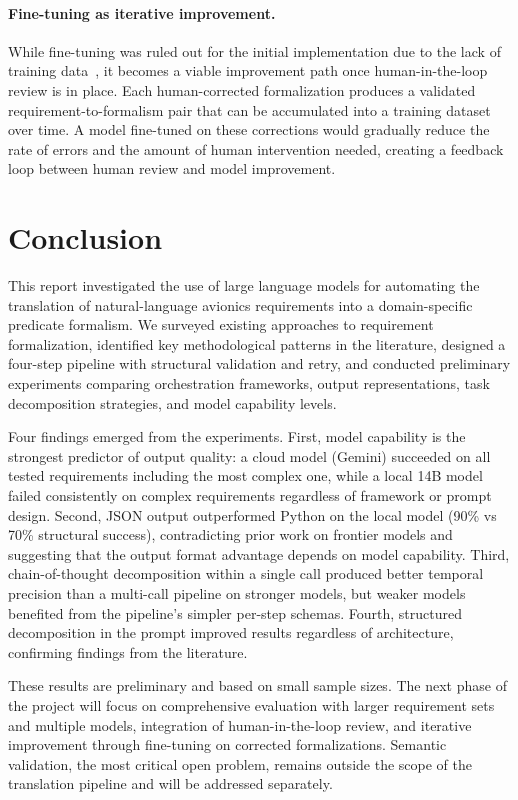\paragraph{Fine-tuning as iterative improvement.}
While fine-tuning was ruled out for the initial implementation due to the
lack of training data~\cite{hahn2022formal}, it becomes a viable
improvement path once human-in-the-loop review is in place. Each
human-corrected formalization produces a validated
requirement-to-formalism pair that can be accumulated into a training
dataset over time. A model fine-tuned on these corrections would
gradually reduce the rate of errors and the amount of human intervention
needed, creating a feedback loop between human review and model
improvement.


\section{Conclusion}
\label{sec:conclusion}

This report investigated the use of large language models for
automating the translation of natural-language avionics requirements
into a domain-specific predicate formalism. We surveyed existing
approaches to requirement formalization, identified key methodological
patterns in the literature, designed a four-step pipeline with
structural validation and retry, and conducted preliminary experiments
comparing orchestration frameworks, output representations, task
decomposition strategies, and model capability levels.

Four findings emerged from the experiments. First, model capability is
the strongest predictor of output quality: a cloud model (Gemini)
succeeded on all tested requirements including the most complex one,
while a local 14B model failed consistently on complex requirements
regardless of framework or prompt design. Second, JSON output
outperformed Python on the local model (90\% vs 70\% structural
success), contradicting prior work on frontier models and suggesting
that the output format advantage depends on model capability. Third,
chain-of-thought decomposition within a single call produced better
temporal precision than a multi-call pipeline on stronger models, but
weaker models benefited from the pipeline's simpler per-step schemas.
Fourth, structured decomposition in the prompt improved results
regardless of architecture, confirming findings from the literature.

These results are preliminary and based on small sample sizes. The
next phase of the project will focus on comprehensive evaluation with
larger requirement sets and multiple models, integration of
human-in-the-loop review, and iterative improvement through
fine-tuning on corrected formalizations. Semantic validation, the most
critical open problem, remains outside the scope of the translation
pipeline and will be addressed separately.
